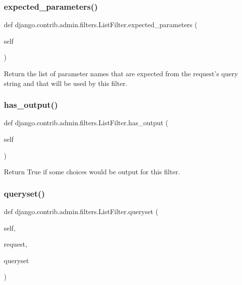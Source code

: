 \subsubsection{\texorpdfstring{expected\+\_\+parameters()}{expected\_parameters()}}
{\footnotesize\ttfamily def django.\+contrib.\+admin.\+filters.\+List\+Filter.\+expected\+\_\+parameters (\begin{DoxyParamCaption}\item[{}]{self }\end{DoxyParamCaption})}

\begin{DoxyVerb}Return the list of parameter names that are expected from the
request's query string and that will be used by this filter.
\end{DoxyVerb}
 \mbox{\label{classdjango_1_1contrib_1_1admin_1_1filters_1_1_list_filter_aa658bcb5f1bd4970a7fe7e78a2a8f457}} 
\subsubsection{\texorpdfstring{has\+\_\+output()}{has\_output()}}
{\footnotesize\ttfamily def django.\+contrib.\+admin.\+filters.\+List\+Filter.\+has\+\_\+output (\begin{DoxyParamCaption}\item[{}]{self }\end{DoxyParamCaption})}

\begin{DoxyVerb}Return True if some choices would be output for this filter.
\end{DoxyVerb}
 \mbox{\label{classdjango_1_1contrib_1_1admin_1_1filters_1_1_list_filter_aed1f92493175185d1714cb763f6efa08}} 
\subsubsection{\texorpdfstring{queryset()}{queryset()}}
{\footnotesize\ttfamily def django.\+contrib.\+admin.\+filters.\+List\+Filter.\+queryset (\begin{DoxyParamCaption}\item[{}]{self,  }\item[{}]{request,  }\item[{}]{queryset }\end{DoxyParamCaption})}

